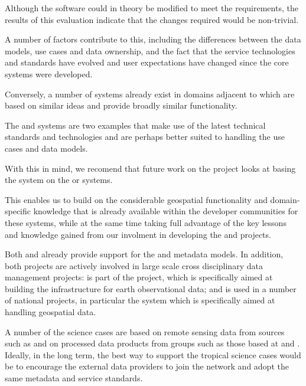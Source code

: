 \documentclass{article}
\begin{document}
Although the \cite{astro} software could in theory be modified to meet
the \cite{tropo} requirements, the results of this evaluation indicate
that the changes required would be non-trivial.

A number of factors contribute to this, including the differences
between the data models, use cases and data ownership, and the fact
that the service technologies and standards have evolved and user
expectations have changed since the core \cite{astro}
systems were developed.

Conversely, a number of systems already exist in domains adjacent to
\cite{atrop} which are based on similar ideas and provide broadly
similar functionality.

The \cite{metacat} and \cite{ckan} systems are two examples that make
use of the latest technical standards and technologies and are perhaps
better suited to handling the \cite{atrop} use cases and data models.

With this in mind, we recomend that future work on the \cite{atrop}
project looks at basing the \cite{atrop} system on the \cite{metacat}
or \cite{ckan} systems.

This enables us to build on the considerable geospatial functionality and
domain-specific knowledge that is already available within the developer
communities for these systems,
while at the same time taking full advantage of the key lessons and
knowledge gained from our involment in developing the \cite{astro} and
\cite{ivoa} \cite{vo} projects.

Both \cite{metacat} and \cite{ckan} already provide support for the \cite{gis}
and \cite{eml} metadata models. In addition, both projects are actively
involved in large scale cross disciplinary data management projects:
\cite{metacat} is part of the \cite{data-one} project, which is specifically
aimed at building the infrastructure for earth observational data; and
\cite{ckan} is used in a number of national \cite{data-gov} projects, in
particular the \cite{fgdc} \cite{fgdc-geo} system which is specifically
aimed at handling geospatial data.
    
A number of the \cite{atrop} science cases are based on remote sensing
data from sources such as \cite{landsat} and on processed data products
from groups such as those based at \cite{nasa-jpl-carbon} and \cite{whrc}.
Ideally, in the long term, the best way to support the tropical
science cases would be to encourage the external data providers to join
the \cite{tropo} network and adopt the same metadata and service standards.
\end{document}
